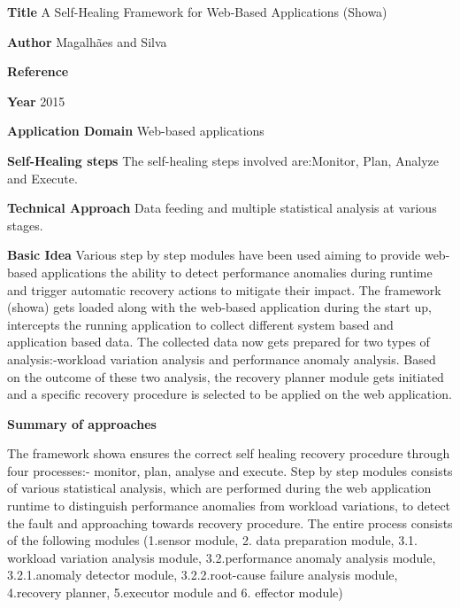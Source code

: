 \begin{compactitem}
\item[\textbf{Title}]A Self-Healing Framework for Web-Based Applications (Showa)

\item[\textbf{Author}]Magalhães and Silva 

\item[\textbf{Reference}]

\cite{magalhaes_showa:_2015}

\item[\textbf{Year}] 2015

\item[\textbf{Application Domain}]
Web-based applications 

\item[\textbf{Self-Healing steps}] 
The self-healing steps involved are:Monitor, Plan, Analyze and Execute.

\item[\textbf{Technical Approach}]Data feeding and multiple statistical  analysis at various stages.

\item[\textbf{Basic Idea}] 
Various step by step modules have been used aiming to provide web-based applications the ability to detect performance anomalies during runtime and trigger automatic recovery actions to mitigate their impact. The framework (showa) gets loaded along with the web-based application during the start up, intercepts the running application to collect different system based and application based data. The collected data now gets prepared for two types of analysis:-workload variation analysis and performance anomaly analysis. Based on the outcome of these two analysis, the recovery planner module gets initiated and a specific recovery procedure is selected to be applied on the web application.

\item[\textbf{Summary of approaches}] 

The framework showa ensures the correct self healing recovery procedure through four processes:- monitor, plan, analyse and execute. Step by step modules consists of various statistical analysis, which are performed during the web application runtime to distinguish performance anomalies from workload variations, to detect the fault and approaching towards recovery procedure. The entire process consists of the following modules (1.sensor module, 2. data preparation module, 3.1. workload variation analysis module, 3.2.performance anomaly analysis module, 3.2.1.anomaly detector module, 3.2.2.root-cause failure analysis module, 4.recovery planner, 5.executor module and 6. effector module)


\end{compactitem}
